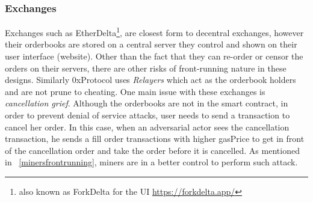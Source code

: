 \subsubsection{Exchanges}
Exchanges such as EtherDelta\footnote{also known as ForkDelta for the UI \url{https://forkdelta.app/}}, are closest form to decentral exchanges, however their orderbooks are stored on a central server they control and shown on their user interface (website). Other than the fact that they can re-order or censor the orders on their servers, there are other risks of front-running nature in these designs. Similarly 0xProtocol uses \textit{Relayers} which act as the orderbook holders and are not prune to cheating. One main issue with these exchanges is \textit{cancellation grief}. Although the orderbooks are not in the smart contract, in order to prevent denial of service attacks, user needs to send a transaction to cancel her order. In this case, when an adversarial actor sees the cancellation transaction, he sends a fill order transactions with higher gasPrice to get in front of the cancellation order and take the order before it is cancelled. As mentioned in ~\ref{minersfrontrunning}, miners are in a better control to perform such attack. 


